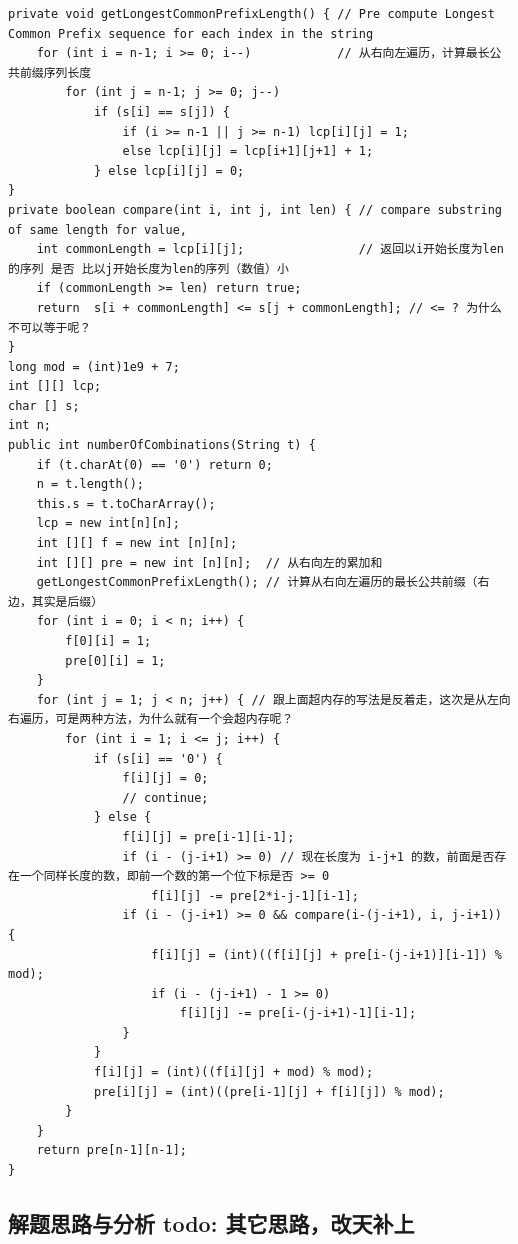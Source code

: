 \documentclass[9pt, b5paaper]{book}
\begin{document}
\begin{verbatim}
private void getLongestCommonPrefixLength() { // Pre compute Longest Common Prefix sequence for each index in the string
    for (int i = n-1; i >= 0; i--)            // 从右向左遍历，计算最长公共前缀序列长度
        for (int j = n-1; j >= 0; j--) 
            if (s[i] == s[j]) {
                if (i >= n-1 || j >= n-1) lcp[i][j] = 1;
                else lcp[i][j] = lcp[i+1][j+1] + 1;
            } else lcp[i][j] = 0;
}
private boolean compare(int i, int j, int len) { // compare substring of same length for value, 
    int commonLength = lcp[i][j];                // 返回以i开始长度为len的序列 是否 比以j开始长度为len的序列（数值）小
    if (commonLength >= len) return true;
    return  s[i + commonLength] <= s[j + commonLength]; // <= ? 为什么不可以等于呢？
}
long mod = (int)1e9 + 7;
int [][] lcp;
char [] s; 
int n;
public int numberOfCombinations(String t) {
    if (t.charAt(0) == '0') return 0;
    n = t.length();
    this.s = t.toCharArray();
    lcp = new int[n][n];
    int [][] f = new int [n][n];
    int [][] pre = new int [n][n];  // 从右向左的累加和
    getLongestCommonPrefixLength(); // 计算从右向左遍历的最长公共前缀（右边，其实是后缀）
    for (int i = 0; i < n; i++) {
        f[0][i] = 1;
        pre[0][i] = 1;
    }
    for (int j = 1; j < n; j++) { // 跟上面超内存的写法是反着走，这次是从左向右遍历，可是两种方法，为什么就有一个会超内存呢？
        for (int i = 1; i <= j; i++) {
            if (s[i] == '0') {
                f[i][j] = 0;
                // continue;
            } else {
                f[i][j] = pre[i-1][i-1];
                if (i - (j-i+1) >= 0) // 现在长度为 i-j+1 的数，前面是否存在一个同样长度的数，即前一个数的第一个位下标是否 >= 0
                    f[i][j] -= pre[2*i-j-1][i-1];
                if (i - (j-i+1) >= 0 && compare(i-(j-i+1), i, j-i+1)) {
                    f[i][j] = (int)((f[i][j] + pre[i-(j-i+1)][i-1]) % mod);
                    if (i - (j-i+1) - 1 >= 0)
                        f[i][j] -= pre[i-(j-i+1)-1][i-1];
                }
            }
            f[i][j] = (int)((f[i][j] + mod) % mod);
            pre[i][j] = (int)((pre[i-1][j] + f[i][j]) % mod);
        }
    }
    return pre[n-1][n-1];
}
\end{verbatim}
\subsection{解题思路与分析 todo: 其它思路，改天补上}
\label{sec-15-1-2}
\end{document}
